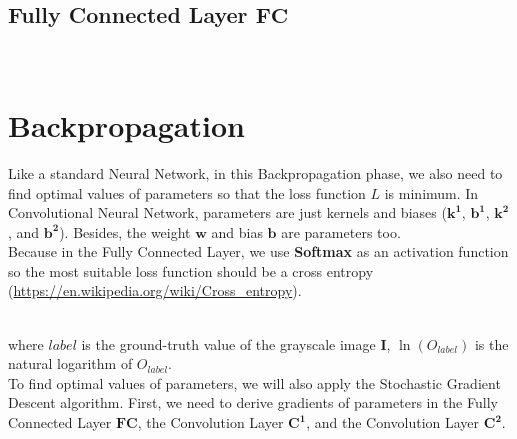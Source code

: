 \documentclass[a4paper,12pt]{article}
\newcommand*\myyellowbox[1]{%
\colorbox{myyellow}{\hspace{1em}#1\hspace{1em}}}
\begin{document}
\subsection{Fully Connected Layer $\boldsymbol{FC}$}
\\[-0.7cm]


\section{Backpropagation}
Like a standard Neural Network, in this Backpropagation phase, we also need to find optimal values of parameters so that the loss function $L$ is minimum. In Convolutional Neural Network, parameters are just kernels and biases ($\boldsymbol{k^1}$, $\boldsymbol{b^1}$, $\boldsymbol{k^2}$, and $\boldsymbol{b^2}$). Besides, the weight $\boldsymbol{w}$ and bias $\boldsymbol{b}$ are parameters too.\\[0.3cm]
Because in the Fully Connected Layer, we use \textbf{Softmax} as an activation function so the most suitable loss function should be a cross entropy (\url{https://en.wikipedia.org/wiki/Cross_entropy}).
\\
where $label$ is the ground-truth value of the grayscale image $\boldsymbol{I}$, $\ln(O_{label})$ is the natural logarithm of $O_{label}$.\\[0.3cm]
To find optimal values of parameters, we will also apply the Stochastic Gradient Descent algorithm. First, we need to derive gradients of parameters in the Fully Connected Layer $\boldsymbol{FC}$, the Convolution Layer $\boldsymbol{C^1}$, and the Convolution Layer $\boldsymbol{C^2}$.
\end{document}
